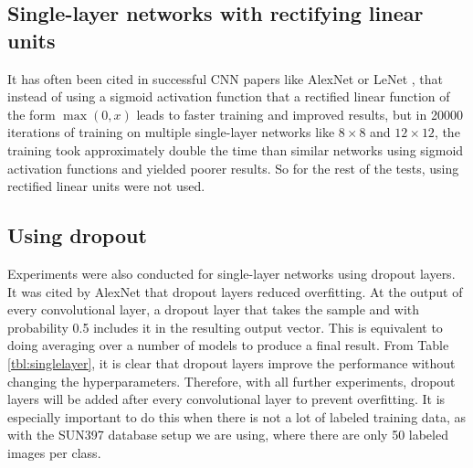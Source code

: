 \documentclass[10pt]{article}
\begin{document}
\begin{table}[!ht]
\centering
{}
\caption{Summary of top-1 and top-5 accuracy results on single-layer networks after 20000 iterations}
\label{tbl:singlelayer}
\end{table}

\subsection{Single-layer networks with rectifying linear units}

It has often been cited in successful CNN papers like AlexNet or LeNet \cite{krizhevsky_imagenet_2012}, \cite{lecun_handwritten_1990} that instead of using a sigmoid activation function that a rectified linear function of the form $\max(0, x)$ leads to faster training and improved results, but in 20000 iterations of training on multiple single-layer networks like $8 \times 8$ and $12 \times 12$, the training took approximately double the time than similar networks using sigmoid activation functions and yielded poorer results. So for the rest of the tests, using rectified linear units were not used.

\subsection{Using dropout}

Experiments were also conducted for single-layer networks using dropout layers. It was cited by AlexNet \cite{krizhevsky_imagenet_2012} that dropout layers reduced overfitting. At the output of every convolutional layer, a dropout layer that takes the sample and with probability 0.5 includes it in the resulting output vector. This is equivalent to doing averaging over a number of models to produce a final result. From Table \ref{tbl:singlelayer}, it is clear that dropout layers improve the performance without changing the hyperparameters. Therefore, with all further experiments, dropout layers will be added after every convolutional layer to prevent overfitting. It is especially important to do this when there is not a lot of labeled training data, as with the SUN397 database setup we are using, where there are only 50 labeled images per class.
\end{document}
